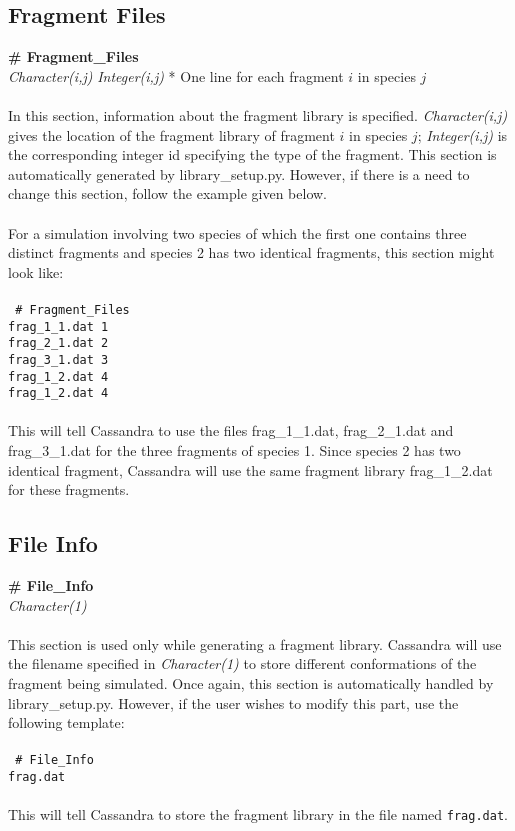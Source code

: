 \subsection{Fragment Files}\label{sec:Fragment_Files}
{\bf \# Fragment\_Files} \\
{\it Character(i,j)} {\it Integer(i,j)} * One line for each fragment $i$ in species $j$ \\ \\
%
In this section, information about the fragment library is specified. {\it Character(i,j)} gives
the location of the fragment library of fragment $i$ in species $j$; {\it Integer(i,j)} is the
corresponding integer id specifying the type of the fragment. This section is automatically
generated by library\_setup.py. However, if there is a need to change this section, follow the example
given below. \\ \\
%
For a simulation involving two species of which the first one contains three distinct fragments and species 2
has two identical fragments, this section might look like: \\ \\
%
\texttt{
\# Fragment\_Files  \\
frag\_1\_1.dat 1 \\
frag\_2\_1.dat 2 \\
frag\_3\_1.dat 3 \\
frag\_1\_2.dat 4 \\
frag\_1\_2.dat 4 \\ \\
}
%
This will tell Cassandra to use the files frag\_1\_1.dat, frag\_2\_1.dat and frag\_3\_1.dat for the three
fragments of species 1. Since species 2 has two identical fragment, Cassandra will use the same
fragment library frag\_1\_2.dat for these fragments. 
%
%
\subsection{File Info}\label{sec:File_Info}
{\bf \# File\_Info } \\
{\it Character(1)} \\ \\
%
This section is used only while generating a fragment library. Cassandra will use the filename
specified in {\it Character(1)} to store different conformations of the fragment being simulated. Once again, this
section is automatically handled by library\_setup.py. However, if the user wishes to modify this part, 
use the following template: \\ \\
%
\texttt{
\# File\_Info \\ 
frag.dat \\ \\}
%
This will tell Cassandra to store the fragment library in the file named \texttt{frag.dat}.
%
%
%

